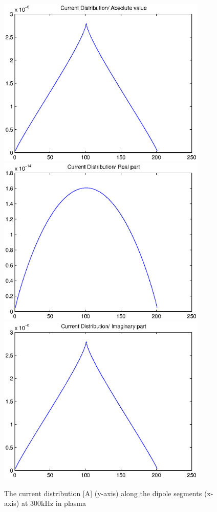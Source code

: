 \documentclass[a4paper,11pt]{thesis}
\begin{document}
\begin{figure}
 \begin{center}
\includegraphics[width=10.0cm]{DissPics/curr_abs_3kh_p.eps}
 \includegraphics[width=10.0cm]{DissPics/curr_re_3kh_p.eps}
 \includegraphics[width=10.0cm]{DissPics/curr_im_3kh_p.eps}\end{center}
  \caption{The current distribution [A] (y-axis) along the dipole segments (x-axis) at 300kHz in plasma}\label{fig:curr_3kh_pl}
\end{figure}
\end{document}
